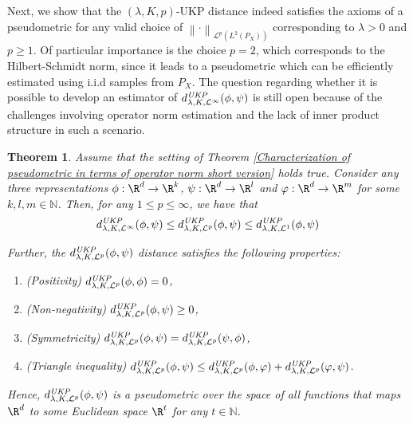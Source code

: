 \documentclass{article} %
\newcommand{\N}{\mathbb{N}}
\newcommand{\repone}{\phi}
\newcommand{\reptwo}{\psi}
\newcommand{\repthree}{\varphi}
\newcommand{\norm}[1]{\left\|#1\right\|}
\newcommand{\LPtwo}{L^{2}(P_{X})}
\newcommand{\Lptwo}{\mathcal{L}^{p}(\LPtwo)}
\newcommand{\metricstname}{UKP }
\newcommand{\dop}{d_{\lambda,K,\mathcal{L}^{\infty}}^{\emph{\metricstname}}}
\newcommand{\done}{d_{\lambda,K,\mathcal{L}^{1}}^{\emph{\metricstname}}}
\newcommand{\dLp}{d_{\lambda,K,\mathcal{L}^{p}}^{\emph{\metricstname}}}
\theoremstyle{plain}
\newcounter{theoremno}
\newtheorem{theorem}[theoremno]{Theorem}
\begin{document}
Next, we show that the $(\lambda,K,p)$-\metricstname distance indeed satisfies the axioms of a pseudometric for any valid choice of $\norm{\cdot}_{\Lptwo}$ corresponding to $\lambda>0$ and $p \geq 1$. Of particular importance is the choice $p=2$, which corresponds to the Hilbert-Schmidt norm, since it leads to a pseudometric which can be efficiently estimated using i.i.d samples from $P_X$. The question regarding whether it is possible to develop an estimator of $\dop(\repone,\reptwo)$ is still open because of the challenges involving operator norm estimation and the lack of inner product structure in such a scenario.

\begin{theorem}\label{Theorem: Monotonicity and Pseudometricity short version}
    Assume that the setting of Theorem \ref{Characterization of pseudometric in terms of operator norm short version} holds true. Consider any three representations $\repone: \R^d \to \R^k$, $\reptwo: \R^d \to \R^l$ and $\repthree: \R^d \to \R^m$ for some $k,l,m \in \N$.  
    Then, for any $1 \leq p \leq \infty$, we have that
    \begin{equation}
    \begin{aligned}\label{monotonicity of family of UKP distances for p choices short version}
        \dop(\repone,\reptwo) \leq \dLp(\repone,\reptwo) \leq \done(\repone, \reptwo)
    \end{aligned}
    \end{equation}

    Further, the $\dLp(\repone,\reptwo)$ distance satisfies the following properties:
    \begin{enumerate}
        \item (Positivity) $\dLp(\repone,\repone) = 0$,
        \item (Non-negativity)  $\dLp(\repone,\reptwo) \geq 0$,
        \item (Symmetricity) $\dLp(\repone,\reptwo) = \dLp(\reptwo,\repone)$,
        \item (Triangle inequality)  $\dLp(\repone,\reptwo) \leq \dLp(\repone,\repthree) + \dLp(\repthree,\reptwo)$.
    \end{enumerate}
    Hence, $\dLp(\repone,\reptwo)$ is a pseudometric over the space of all functions that maps $\R^d$ to some Euclidean space $\R^t$ for any $t \in \N$.
    

\end{theorem}
\end{document}
